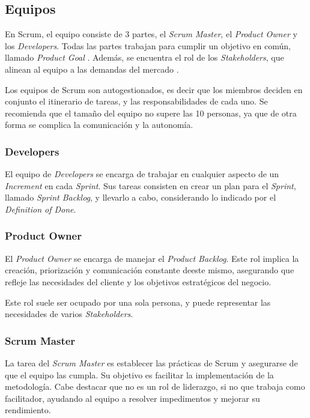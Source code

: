 \subsection{Equipos}
\par En Scrum, el equipo consiste de 3 partes, el \emph{Scrum Master}, el \emph{Product Owner} y los \emph{Developers}. Todas las partes trabajan para cumplir un objetivo en común, llamado \emph{Product Goal} \cite{schwaberScrumGuide2020}. Además, se encuentra el rol de los \emph{Stakeholders}, que alinean al equipo a las demandas del mercado \cite{schwaberScrumGuide2020}.
\par Los equipos de Scrum son autogestionados, es decir que los miembros deciden en conjunto el itinerario de tareas, y las responsabilidades de cada uno. Se recomienda que el tamaño del equipo no supere las 10 personas, ya que de otra forma se complica la comunicación y la autonomía.
\subsubsection{Developers}
\par El equipo de \emph{Developers} se encarga de trabajar en cualquier aspecto de un \emph{Increment} en cada \emph{Sprint}. Sus tareas consisten en crear un plan para el \emph{Sprint}, llamado \emph{Sprint Backlog}, y llevarlo a cabo, considerando lo indicado por el \emph{Definition of Done}.
%
\subsubsection{Product Owner}
\par El \emph{Product Owner} se encarga de manejar el \emph{Product Backlog}. Este rol implica la creación, priorización y comunicación constante deeste mismo, asegurando que refleje las necesidades del cliente y los objetivos estratégicos del negocio.
\par Este rol suele ser ocupado por una sola persona, y puede representar las necesidades de varios \emph{Stakeholders}.
%
\subsubsection{Scrum Master}
La tarea del \emph{Scrum Master} es establecer las prácticas de Scrum y asegurarse de que el equipo las cumpla. Su objetivo es facilitar la implementación de la metodología. Cabe destacar que no es un rol de liderazgo, si no que trabaja como facilitador, ayudando al equipo a resolver impedimentos y mejorar su rendimiento.
